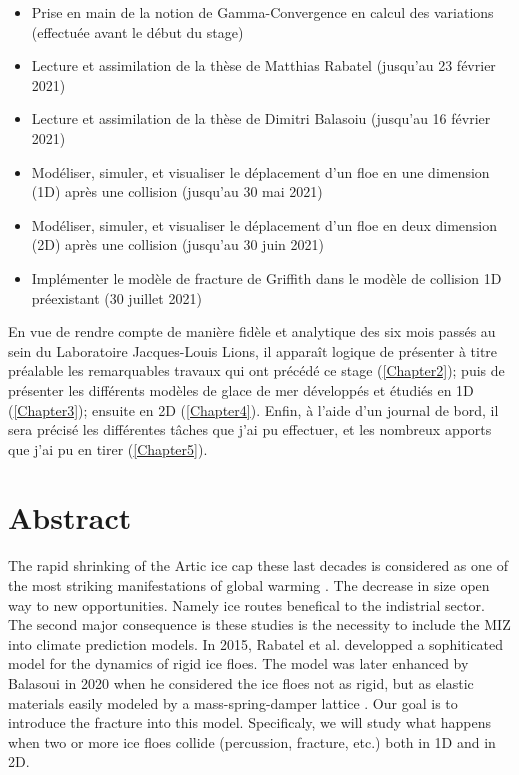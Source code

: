 \begin{itemize}
    \item Prise en main de la notion de Gamma-Convergence en calcul des variations (effectuée avant le début du stage)
    \item Lecture et assimilation de la thèse de Matthias Rabatel (jusqu'au 23 février 2021)
    \item Lecture et assimilation de la thèse de Dimitri Balasoiu (jusqu'au 16 février 2021)
    \item Modéliser, simuler, et visualiser le déplacement d'un floe en une dimension (1D) après une collision (jusqu'au 30 mai 2021)
    \item Modéliser, simuler, et visualiser le déplacement d'un floe en deux dimension (2D) après une collision (jusqu'au 30 juin 2021)
    \item Implémenter le modèle de fracture de Griffith dans le modèle de collision 1D préexistant (30 juillet 2021)
\end{itemize}



En vue de rendre compte de manière fidèle et analytique des six mois passés au sein du Laboratoire Jacques-Louis Lions, il apparaît logique de présenter à titre préalable les remarquables travaux qui ont précédé ce stage (\cref{Chapter2}); puis de présenter les différents modèles de glace de mer développés et étudiés en 1D (\cref{Chapter3}); ensuite en 2D (\cref{Chapter4}). Enfin, à l'aide d'un journal de bord, il sera précisé les différentes tâches que j’ai pu effectuer, et les nombreux apports que j’ai pu en tirer (\cref{Chapter5}). 









\section{Abstract}


The rapid shrinking of the Artic ice cap these last decades is considered as one of the most striking manifestations of global warming \parencite{stroeve2012trends}. The decrease in size open way to new opportunities. Namely ice routes benefical to the indistrial sector. The second major consequence is these studies is the necessity to include the MIZ into climate prediction models. In 2015, Rabatel et al. \parencite{rabatel2015dynamics,rabatel2015thesis} developped a sophiticated model for the dynamics of rigid ice floes. The model was later enhanced by Balasoui in 2020 when he considered the ice floes not as rigid, but as elastic materials easily modeled by a mass-spring-damper lattice \parencite{balasoiu2020halthesis}. Our goal is to introduce the fracture into this model. Specificaly, we will study what happens when two or more ice floes collide (percussion, fracture, etc.) both in 1D and in 2D.